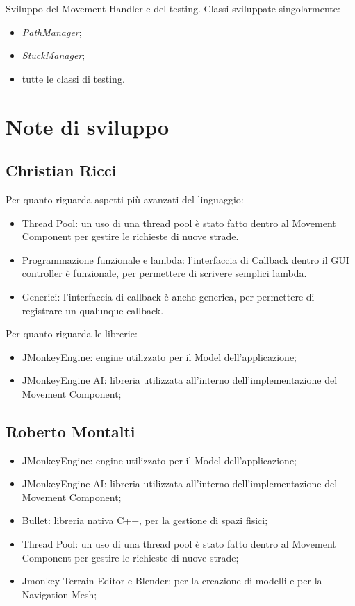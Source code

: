 \documentclass[a4paper,12pt]{report}
\begin{document}
Sviluppo del Movement Handler e del testing.
Classi sviluppate singolarmente:
\begin{itemize}
    \item \emph{PathManager};
    \item \emph{StuckManager};
    \item tutte le classi di testing.
\end{itemize}

\section{Note di sviluppo}

\subsection{Christian Ricci}

Per quanto riguarda aspetti più avanzati del linguaggio:
\begin{itemize}
\item Thread Pool: un uso di una thread pool è stato fatto dentro al Movement Component per gestire le richieste di nuove strade.
\item Programmazione funzionale e lambda: l'interfaccia di Callback dentro il GUI controller è funzionale, per permettere di scrivere semplici lambda.
\item Generici: l'interfaccia di callback è anche generica, per permettere di registrare un qualunque callback.
\end{itemize}

Per quanto riguarda le librerie:
\begin{itemize}
\item JMonkeyEngine: engine utilizzato per il Model dell'applicazione;
\item JMonkeyEngine AI: libreria utilizzata all'interno dell'implementazione del Movement Component;
\end{itemize}

\subsection{Roberto Montalti}

\begin{itemize}
\item JMonkeyEngine: engine utilizzato per il Model dell'applicazione;
\item JMonkeyEngine AI: libreria utilizzata all'interno dell'implementazione del Movement Component;
\item Bullet: libreria nativa C++, per la gestione di spazi fisici;
\item Thread Pool: un uso di una thread pool è stato fatto dentro al Movement Component per gestire le richieste di nuove strade;
\item Jmonkey Terrain Editor e Blender: per la creazione di modelli e per la Navigation Mesh; 
\end{itemize}
\end{document}
